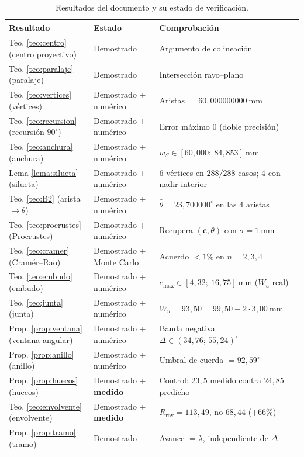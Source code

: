 \documentclass[11pt,a4paper]{article}
\theoremstyle{definition}
\newcommand{\cc}{\mathbf{c}}
\newcommand{\grados}{^{\circ}}
\begin{document}
\begin{table}[htbp]
\centering
\small
\caption{Resultados del documento y su estado de verificación.}
\begin{tabular}{llp{6.6cm}}
\toprule
Resultado & Estado & Comprobación \\
\midrule
Teo. \ref{teo:centro} (centro proyectivo) & Demostrado & Argumento de colineación \\
Teo. \ref{teo:paralaje} (paralaje) & Demostrado & Intersección rayo--plano \\
Teo. \ref{teo:vertices} (vértices) & Demostrado + numérico & Aristas $= 60{,}000000000\ \mathrm{mm}$ \\
Teo. \ref{teo:recursion} (recursión $90\grados$) & Demostrado + numérico & Error máximo $0$ (doble precisión) \\
Teo. \ref{teo:anchura} (anchura) & Demostrado + numérico & $w_S \in [60{,}000;\ 84{,}853]\ \mathrm{mm}$ \\
Lema \ref{lema:silueta} (silueta) & Demostrado + numérico & $6$ vértices en $288/288$ casos; $4$ con nadir interior \\
Teo. \ref{teo:B2} (arista $\to\theta$) & Demostrado + numérico & $\hat\theta = 23{,}700000\grados$ en las $4$ aristas \\
Teo. \ref{teo:procrustes} (Procrustes) & Demostrado + numérico & Recupera $(\cc,\theta)$ con $\sigma=1\ \mathrm{mm}$ \\
Teo. \ref{teo:cramer} (Cramér--Rao) & Demostrado + Monte Carlo & Acuerdo $<1\%$ en $n=2,3,4$ \\
Teo. \ref{teo:embudo} (embudo) & Demostrado + numérico & $e_{\max}\in[4{,}32;\ 16{,}75]\ \mathrm{mm}$ ($W_u$ real) \\
Teo. \ref{teo:junta} (junta) & Demostrado + numérico & $W_u = 93{,}50 = 99{,}50 - 2\cdot 3{,}00\ \mathrm{mm}$ \\
Prop. \ref{prop:ventana} (ventana angular) & Demostrado + numérico & Banda negativa $\Delta\in(34{,}76;\,55{,}24)\grados$ \\
Prop. \ref{prop:anillo} (anillo) & Demostrado + numérico & Umbral de cuerda $= 92{,}59\grados$ \\
Prop. \ref{prop:huecos} (huecos) & Demostrado + \textbf{medido} & Control: $23{,}5$ medido contra $24{,}85$ predicho \\
Teo. \ref{teo:envolvente} (envolvente) & Demostrado + \textbf{medido} & $R_{\mathrm{rov}} = 113{,}49$, no $68{,}44$ ($+66\%$) \\
Prop. \ref{prop:tramo} (tramo) & Demostrado & Avance $=\lambda$, independiente de $\Delta$ \\
\bottomrule
\end{tabular}
\end{table}
\end{document}
